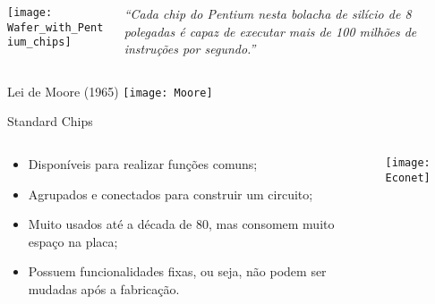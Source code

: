 \begin{frame}{\insertsection} 
    \begin{columns}
        \begin{column}{0.40\textwidth}
            \texttt{[image: Wafer\_with\_Pentium\_chips]}
        \end{column}
        \begin{column}{0.60\textwidth}
            \centering \textit{``Cada chip do Pentium nesta bolacha de silício de 8 polegadas é capaz de executar mais de 100 milhões de instruções por segundo.''}
        \end{column}
    \end{columns}
\end{frame}

\begin{frame}{Lei de Moore (1965)}
    \centering
    \texttt{[image: Moore]}
\end{frame}

\begin{frame}{Standard Chips} 
    \begin{columns}
        \begin{column}{0.60\textwidth}
            \begin{itemize}
                \item Disponíveis para realizar funções comuns;
                \item Agrupados e conectados para construir um circuito;
                \item Muito usados até a década de 80, mas consomem muito espaço na placa;
                \item Possuem funcionalidades fixas, ou seja, não podem ser mudadas após a fabricação. 
            \end{itemize}
        \end{column}
        \begin{column}{0.40\textwidth}
            \texttt{[image: Econet]}
        \end{column}        
    \end{columns}
\end{frame}

